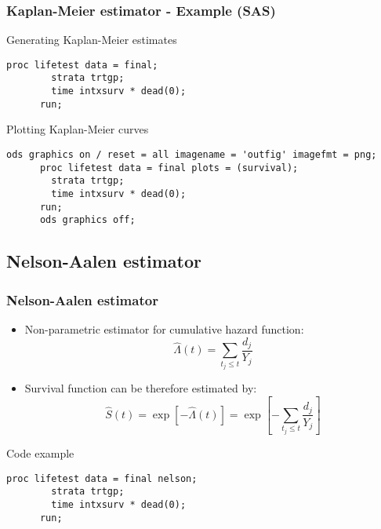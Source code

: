 \documentclass[11pt, aspectratio = 169]{beamer}
\begin{document}
\begin{frame}[fragile]
  \frametitle{Kaplan-Meier estimator - Example (SAS)}
  \begin{block}{Generating Kaplan-Meier estimates}
    \begin{lstlisting}[gobble = 6]
      proc lifetest data = final;
        strata trtgp;
        time intxsurv * dead(0);
      run;
    \end{lstlisting}
  \end{block}
  \begin{block}{Plotting Kaplan-Meier curves}
    \begin{lstlisting}[gobble = 6]
      ods graphics on / reset = all imagename = 'outfig' imagefmt = png;
      proc lifetest data = final plots = (survival);
        strata trtgp;
        time intxsurv * dead(0);
      run;
      ods graphics off;
    \end{lstlisting}
  \end{block}
\end{frame}

\subsection{Nelson-Aalen estimator}

\begin{frame}[fragile]
  \frametitle{Nelson-Aalen estimator}
  \begin{itemize}
    \item Non-parametric estimator for cumulative hazard function:
    \begin{equation*}
      \hat{\Lambda}(t) = \sum_{t_j \le t}\frac{d_j}{Y_j}
    \end{equation*}
    \item Survival function can be therefore estimated by:
    \begin{equation*}
      \hat{S}(t) = \exp\left[-\hat{\Lambda}(t)\right] = \exp\left[-\sum_{t_j \le t}\frac{d_j}{Y_j}\right]
    \end{equation*}
  \end{itemize}
  \begin{block}{Code example}
    \begin{lstlisting}[gobble = 6]
      proc lifetest data = final nelson;
        strata trtgp;
        time intxsurv * dead(0);
      run;
    \end{lstlisting}
  \end{block}
\end{frame}
\end{document}

